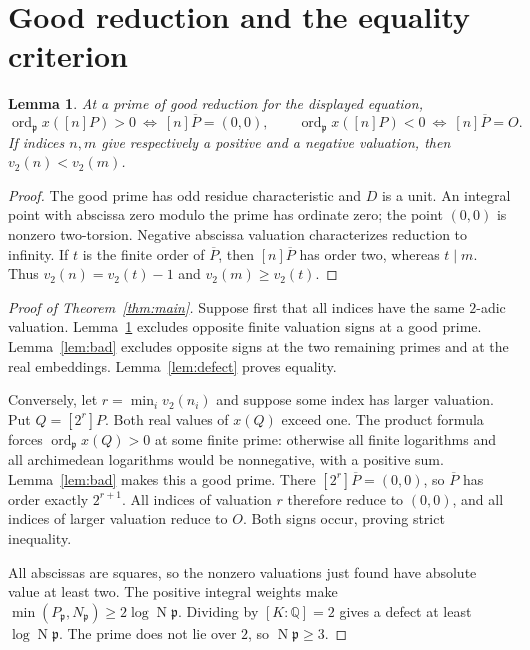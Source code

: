 \documentclass[11pt,a4paper]{article}
\newtheorem{lemma}[theorem]{Lemma}
\newcommand{\Q}{\mathbb Q}\newcommand{\Z}{\mathbb Z}
\DeclareMathOperator{\ord}{ord}\DeclareMathOperator{\N}{N}
\begin{document}
\section{Good reduction and the equality criterion}
\begin{lemma}\label{lem:good}
At a prime of good reduction for the displayed equation,
\[
 \ord_{\mathfrak p}x([n]P)>0\ \Longleftrightarrow\ [n]\overline P=(0,0),
 \qquad
 \ord_{\mathfrak p}x([n]P)<0\ \Longleftrightarrow\ [n]\overline P=O.
\]
If indices $n,m$ give respectively a positive and a negative valuation,
then $v_2(n)<v_2(m)$.
\end{lemma}
\begin{proof}
The good prime has odd residue characteristic and $D$ is a unit.
An integral point with abscissa zero modulo the prime has ordinate zero;
the point $(0,0)$ is nonzero two-torsion. Negative abscissa valuation
characterizes reduction to infinity. If $t$ is the finite order of
$\overline P$, then $[n]\overline P$ has order two, whereas $t\mid m$.
Thus $v_2(n)=v_2(t)-1$ and $v_2(m)\ge v_2(t)$.
\end{proof}

\begin{proof}[Proof of Theorem~\ref{thm:main}]
Suppose first that all indices have the same $2$-adic valuation.
Lemma~\ref{lem:good} excludes opposite finite valuation signs at a good
prime. Lemma~\ref{lem:bad} excludes opposite signs at the two remaining
primes and at the real embeddings. Lemma~\ref{lem:defect} proves equality.

Conversely, let $r=\min_i v_2(n_i)$ and suppose some index has larger
valuation. Put $Q=[2^r]P$. Both real values of $x(Q)$ exceed one.
The product formula forces $\ord_{\mathfrak p}x(Q)>0$ at some finite
prime: otherwise all finite logarithms and all archimedean logarithms
would be nonnegative, with a positive sum. Lemma~\ref{lem:bad} makes
this a good prime. There $[2^r]\overline P=(0,0)$, so
$\overline P$ has order exactly $2^{r+1}$. All indices of valuation $r$
therefore reduce to $(0,0)$, and all indices of larger valuation reduce
to $O$. Both signs occur, proving strict inequality.

All abscissas are squares, so the nonzero valuations just found have
absolute value at least two. The positive integral weights make
$\min(P_{\mathfrak p},N_{\mathfrak p})\ge2\log\N\mathfrak p$.
Dividing by $[K:\Q]=2$ gives a defect at least $\log\N\mathfrak p$.
The prime does not lie over $2$, so $\N\mathfrak p\ge3$.
\end{proof}
\end{document}
